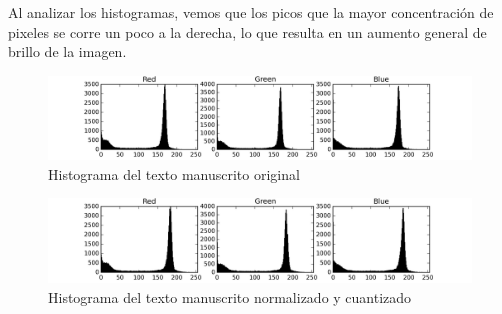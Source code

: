 \documentclass[11pt,spanish]{article}
\begin{document}
Al analizar los histogramas, vemos que los picos que la mayor concentración de pixeles se corre un poco a la derecha, lo que resulta en un aumento general de brillo de la imagen.

\begin{figure}[htbp]
	\centering
	\includegraphics[width=1\textwidth]{../words_image_histogram.jpg}
	\caption{Histograma del texto manuscrito original}
	\label{hist_original_word}
\end{figure}

\begin{figure}[htbp]
	\centering
	\includegraphics[width=1\textwidth]{../words_quantized_image_histogram.jpg}
	\caption{Histograma del texto manuscrito normalizado y cuantizado}
	\label{hist_quantized_word}
\end{figure}
\end{document}

